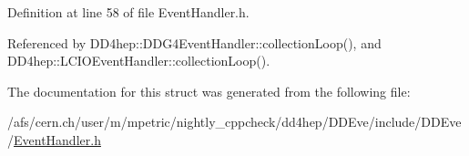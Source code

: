 Definition at line 58 of file EventHandler.h.

Referenced by DD4hep::DDG4EventHandler::collectionLoop(), and DD4hep::LCIOEventHandler::collectionLoop().

The documentation for this struct was generated from the following file:\begin{DoxyCompactItemize}
\item 
/afs/cern.ch/user/m/mpetric/nightly\_\-cppcheck/dd4hep/DDEve/include/DDEve/\hyperlink{_event_handler_8h}{EventHandler.h}\end{DoxyCompactItemize}
